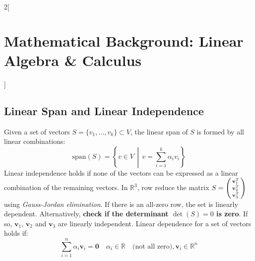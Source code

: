 \documentclass[oneside,fontsize=11pt,paper=a4]{scrartcl}
\begin{document}
\begin{multicols}{2}[\section{Mathematical Background: Linear Algebra \& Calculus}]
\subsection{Linear Span and Linear Independence}
Given a set of vectors $S = \{v_1, \dots, v_k \} \subset V$, the linear span of $S$ is formed by all linear combinations:
\begin{equation*}
	\text{span}(S) = \left\{ v \in V \,\middle\vert\, v = \sum_{i=1}^k \alpha_i v_i \right\}
\end{equation*}
Linear independence holds if none of the vectors can be expressed as a linear combination of the remaining vectors. In $\mathbb{R}^3$, row reduce the matrix $S = \begin{psmallmatrix} \mathbf{v}^T_1\\ \mathbf{v}^T_2\\\mathbf{v}^T_3\end{psmallmatrix}$ using \textit{Gauss-Jordan elimination}.
If there is an all-zero row, the set is linearly dependent. Alternatively, \textbf{check if the determinant $\det(S) = 0$ is zero}. If so, $\mathbf{v}_1$, $\mathbf{v}_2$ and $\mathbf{v}_3$ are linearly independent. Linear dependence for a set of vectors holds if:
\begin{equation*}
	\sum_{i=1}^{n} \alpha_i \mathbf{v}_i = \mathbf{0} \quad \alpha_i \in \mathbb{R} \quad \text{(not all zero)}, \mathbf{v}_i \in \mathbb{R}^n
\end{equation*}


\end{multicols}
\end{document}
